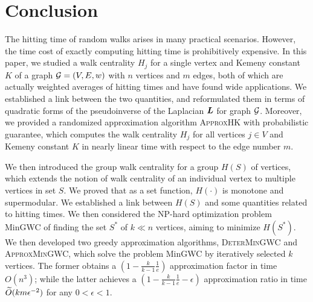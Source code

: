 \documentclass[10pt,twocolumn,twoside]{IEEEtran}
\begin{document}


\section{Conclusion}

The hitting time of random walks arises in many practical scenarios. However, the time cost of exactly computing hitting time is prohibitively expensive. In this paper, we studied a walk centrality $H_j$ for a single vertex and Kemeny constant $K$ of a graph \(\mathcal{G}=(V,E,w)\) with $n$ vertices and $m$ edges, both of which are actually weighted averages of hitting times and have found wide applications. We established a link between the two quantities, and reformulated them in terms of quadratic forms of the pseudoinverse of the Laplacian $\boldsymbol{L}$ for graph $\mathcal{G}$. Moreover, we provided a randomized approximation algorithm \textsc{ApproxHK} with probabilistic guarantee, which computes the walk centrality $H_j$ for all vertices $j \in V$ and Kemeny constant $K$ in nearly linear time with respect to the edge number $m$.

We then introduced the group walk centrality  for a group $H(S)$ of vertices, which extends the notion of walk centrality of an individual vertex to multiple vertices in set $S$. We proved that as a set function, $H(\cdot)$ is monotone and supermodular.
We established a link between  $H(S)$ and some quantities related to hitting times.  We then considered the NP-hard optimization problem MinGWC of finding the set $S^*$ of $k \ll n$ vertices, aiming to minimize $H(S^*)$. We then developed two greedy approximation algorithms, \textsc{DeterMinGWC} and \textsc{ApproxMinGWC}, which solve the problem MinGWC by iteratively selected $k$ vertices. The former obtains a $(1-\frac{k}{k-1} \frac{1}{e})$ approximation factor in time $O(n^3)$; while the latter achieves a $(1-\frac{k}{k-1}\frac{1}{e}-\epsilon)$ approximation ratio in time $\widetilde{O} (km\epsilon^{-2})$ for any $0<\epsilon <1$.
\end{document}
